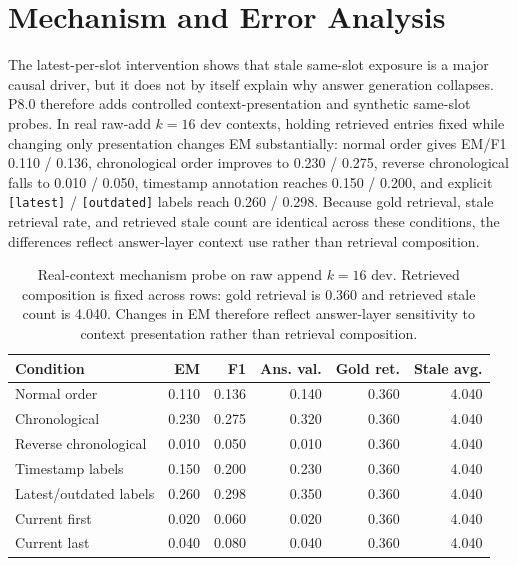 \documentclass[11pt]{article}
\begin{document}
\section{Mechanism and Error Analysis}

The latest-per-slot intervention shows that stale same-slot exposure is a major causal driver, but it does not by itself explain why answer generation collapses. P8.0 therefore adds controlled context-presentation and synthetic same-slot probes. In real raw-add \(k=16\) dev contexts, holding retrieved entries fixed while changing only presentation changes EM substantially: normal order gives EM/F1 0.110 / 0.136, chronological order improves to 0.230 / 0.275, reverse chronological falls to 0.010 / 0.050, timestamp annotation reaches 0.150 / 0.200, and explicit \texttt{[latest]} / \texttt{[outdated]} labels reach 0.260 / 0.298. Because gold retrieval, stale retrieval rate, and retrieved stale count are identical across these conditions, the differences reflect answer-layer context use rather than retrieval composition.

\begin{table}[t]
\centering
\small
\begin{tabular}{lrrrrr}
\toprule
Condition & EM & F1 & Ans. val. & Gold ret. & Stale avg. \\
\midrule
Normal order & 0.110 & 0.136 & 0.140 & 0.360 & 4.040 \\
Chronological & 0.230 & 0.275 & 0.320 & 0.360 & 4.040 \\
Reverse chronological & 0.010 & 0.050 & 0.010 & 0.360 & 4.040 \\
Timestamp labels & 0.150 & 0.200 & 0.230 & 0.360 & 4.040 \\
Latest/outdated labels & 0.260 & 0.298 & 0.350 & 0.360 & 4.040 \\
Current first & 0.020 & 0.060 & 0.020 & 0.360 & 4.040 \\
Current last & 0.040 & 0.080 & 0.040 & 0.360 & 4.040 \\
\bottomrule
\end{tabular}
\caption{Real-context mechanism probe on raw append \(k=16\) dev. Retrieved composition is fixed across rows: gold retrieval is 0.360 and retrieved stale count is 4.040. Changes in EM therefore reflect answer-layer sensitivity to context presentation rather than retrieval composition.}
\label{tab:real-context-mechanism}
\end{table}
\end{document}
